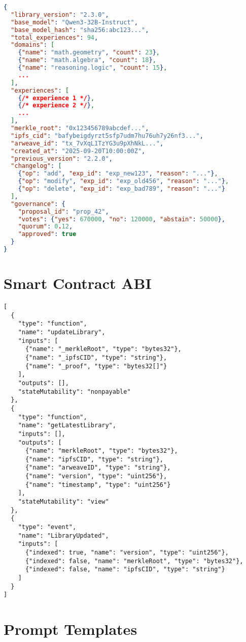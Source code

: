 \documentclass[11pt,letterpaper]{article}
\begin{document}
\begin{lstlisting}[language=json,caption=Experience Library JSON]
{
  "library_version": "2.3.0",
  "base_model": "Qwen3-32B-Instruct",
  "base_model_hash": "sha256:abc123...",
  "total_experiences": 94,
  "domains": [
    {"name": "math.geometry", "count": 23},
    {"name": "math.algebra", "count": 18},
    {"name": "reasoning.logic", "count": 15},
    ...
  ],
  "experiences": [
    {/* experience 1 */},
    {/* experience 2 */},
    ...
  ],
  "merkle_root": "0x123456789abcdef...",
  "ipfs_cid": "bafybeigdyrzt5sfp7udm7hu76uh7y26nf3...",
  "arweave_id": "tx_7vXqL1TzYG3u9pXhNkL...",
  "created_at": "2025-09-20T10:00:00Z",
  "previous_version": "2.2.0",
  "changelog": [
    {"op": "add", "exp_id": "exp_new123", "reason": "..."},
    {"op": "modify", "exp_id": "exp_old456", "reason": "..."},
    {"op": "delete", "exp_id": "exp_bad789", "reason": "..."}
  ],
  "governance": {
    "proposal_id": "prop_42",
    "votes": {"yes": 670000, "no": 120000, "abstain": 50000},
    "quorum": 0.12,
    "approved": true
  }
}
\end{lstlisting}

\section{Smart Contract ABI}

\begin{lstlisting}[caption=Experience Registry ABI (Simplified)]
[
  {
    "type": "function",
    "name": "updateLibrary",
    "inputs": [
      {"name": "_merkleRoot", "type": "bytes32"},
      {"name": "_ipfsCID", "type": "string"},
      {"name": "_proof", "type": "bytes32[]"}
    ],
    "outputs": [],
    "stateMutability": "nonpayable"
  },
  {
    "type": "function",
    "name": "getLatestLibrary",
    "inputs": [],
    "outputs": [
      {"name": "merkleRoot", "type": "bytes32"},
      {"name": "ipfsCID", "type": "string"},
      {"name": "arweaveID", "type": "string"},
      {"name": "version", "type": "uint256"},
      {"name": "timestamp", "type": "uint256"}
    ],
    "stateMutability": "view"
  },
  {
    "type": "event",
    "name": "LibraryUpdated",
    "inputs": [
      {"indexed": true, "name": "version", "type": "uint256"},
      {"indexed": false, "name": "merkleRoot", "type": "bytes32"},
      {"indexed": false, "name": "ipfsCID", "type": "string"}
    ]
  }
]
\end{lstlisting}

\section{Prompt Templates}
\end{document}
